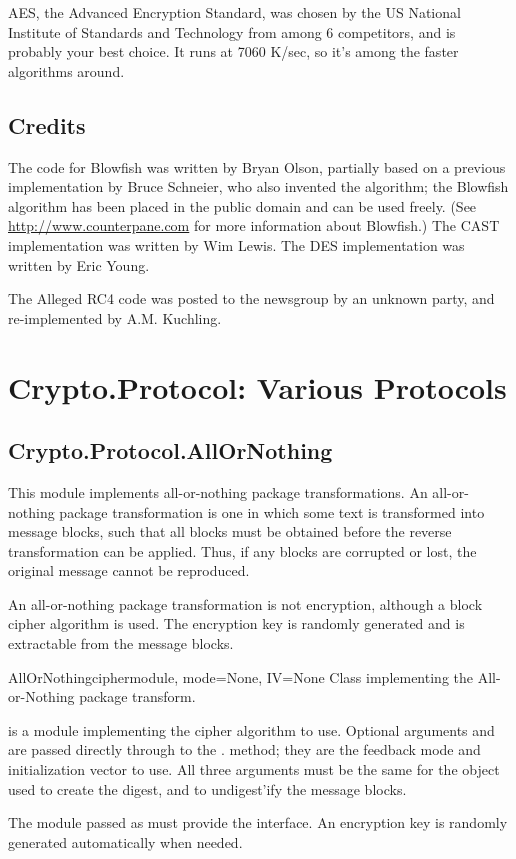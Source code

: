 \documentclass{howto}
\begin{document}
AES, the Advanced Encryption Standard, was chosen by the US National
Institute of Standards and Technology from among 6 competitors, and is
probably your best choice.  It runs at 7060 K/sec, so it's among the
faster algorithms around.


\subsection{Credits}
The code for Blowfish was written by Bryan Olson, partially based on a
previous implementation by Bruce Schneier, who also invented the
algorithm; the Blowfish algorithm has been placed in the public domain
and can be used freely.  (See \url{http://www.counterpane.com} for more
information about Blowfish.)  The CAST implementation was written by 
Wim Lewis.  The DES implementation was written by Eric Young.

The Alleged RC4 code was posted to the  newsgroup by an
unknown party, and re-implemented by A.M. Kuchling.  


\section{Crypto.Protocol: Various Protocols}

\subsection{Crypto.Protocol.AllOrNothing}

This module implements all-or-nothing package transformations.
An all-or-nothing package transformation is one in which some text is
transformed into message blocks, such that all blocks must be obtained before
the reverse transformation can be applied.  Thus, if any blocks are corrupted
or lost, the original message cannot be reproduced.

An all-or-nothing package transformation is not encryption, although a block
cipher algorithm is used.  The encryption key is randomly generated and is
extractable from the message blocks.

\begin{classdesc}{AllOrNothing}{ciphermodule, mode=None, IV=None}
Class implementing the All-or-Nothing package transform.

 is a module implementing the cipher algorithm to
use.  Optional arguments  and  are passed directly
through to the . method; they are the
feedback mode and initialization vector to use.  All three arguments
must be the same for the object used to create the digest, and to
undigest'ify the message blocks.

The module passed as  must provide the 
interface.  An encryption key is randomly generated automatically when
needed.
\end{classdesc}
\end{document}
